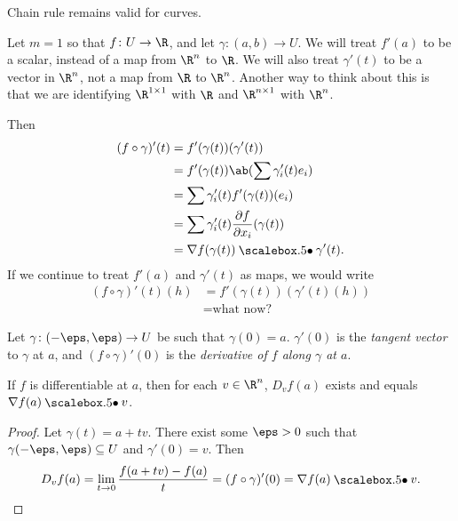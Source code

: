 \begin{remark}
    Chain rule remains valid for curves.

    Let $m = 1$ so that $f\colon U \to \R$, and let
    $\gamma\colon (a, b) \to U$.
    We will treat $f'(a)$ to be a scalar, instead of a map from
    $\R^n$ to $\R$.
    We will also treat $\gamma'(t)$ to be a vector in $\R^n$,
    not a map from $\R$ to $\R^n$.
    Another way to think about this is that we are identifying
    $\R^{1 \times 1}$ with $\R$ and $\R^{n \times 1}$ with $\R^n$.

    Then \begin{align*}
        (f \circ \gamma)'(t) &= f'(\gamma(t))(\gamma'(t)) \\
        &= f'(\gamma(t)) \ab(\sum \gamma_i'(t) e_i) \\
        &= \sum \gamma_i'(t) f'(\gamma(t))(e_i) \\
        &= \sum \gamma_i'(t) \pdv{f}{x_i}(\gamma(t)) \\
        &= \grad f(\gamma(t)) \dotp \gamma'(t).
    \end{align*}
    If we continue to treat $f'(a)$ and $\gamma'(t)$ as maps,
    we would write \begin{align*}
        (f \circ \gamma)'(t)(h)
            &= f'(\gamma(t))(\gamma'(t)(h)) \\
            &= \text{what now?} %
    \end{align*}
\end{remark}

\begin{definition}
    Let $\gamma\colon (-\eps, \eps) \to U$ be such that $\gamma(0) = a$.
    $\gamma'(0)$ is the \emph{tangent vector} to $\gamma$ at $a$,
    and $(f \circ \gamma)'(0)$ is the
    \emph{derivative of $f$ along $\gamma$ at $a$}.
\end{definition}

\begin{proposition}
    If $f$ is differentiable at $a$, then for each $v \in \R^n$,
    $D_v f(a)$ exists and equals $\grad f(a) \dotp v$.
\end{proposition}
\begin{proof}
    Let $\gamma(t) = a + tv$.
    There exist some $\eps > 0$ such that $\gamma(-\eps, \eps) \subseteq U$
    and $\gamma'(0) = v$.
    Then \[
        D_v f(a) = \lim_{t \to 0} \frac{f(a + tv) - f(a)}{t}
        = (f \circ \gamma)'(0) = \grad f(a) \dotp v. \qedhere
    \]
\end{proof}
